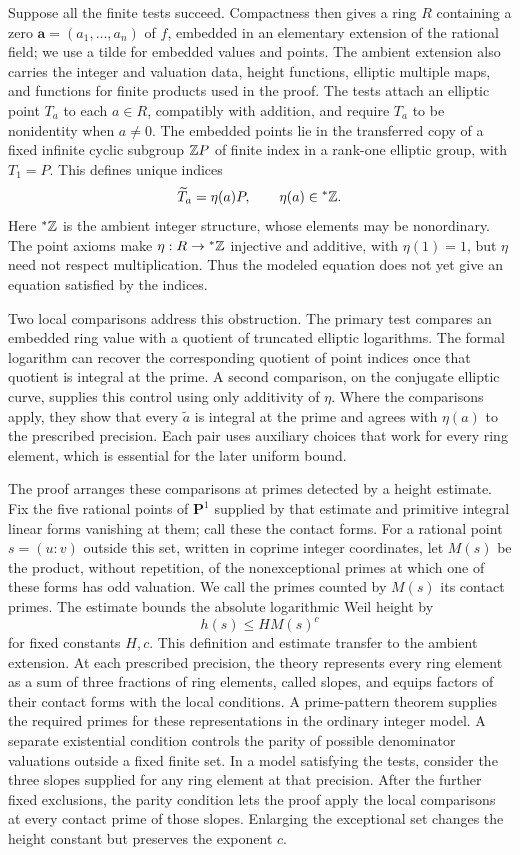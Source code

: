 Suppose all the finite tests succeed. Compactness then gives a ring \(R\) containing a zero \(\mathbf a=(a_1,\ldots,a_n)\) of \(f\), embedded in an elementary extension of the rational field; we use a tilde for embedded values and points. The ambient extension also carries the integer and valuation data, height functions, elliptic multiple maps, and functions for finite products used in the proof. The tests attach an elliptic point \(T_a\) to each \(a\in R\), compatibly with addition, and require \(T_a\) to be nonidentity when \(a\ne0\). The embedded points lie in the transferred copy of a fixed infinite cyclic subgroup \(\mathbb Z P\) of finite index in a rank-one elliptic group, with \(T_1=P\). This defines unique indices
\[
                 \widetilde T_a=\eta(a)P,
                 \qquad \eta(a)\in{}^*\mathbb Z.
\]
Here \({}^*\mathbb Z\) is the ambient integer structure, whose elements may be nonordinary. The point axioms make \(\eta:R\to{}^*\mathbb Z\) injective and additive, with \(\eta(1)=1\), but \(\eta\) need not respect multiplication. Thus the modeled equation does not yet give an equation satisfied by the indices.

Two local comparisons address this obstruction. The primary test compares an embedded ring value with a quotient of truncated elliptic logarithms. The formal logarithm can recover the corresponding quotient of point indices once that quotient is integral at the prime. A second comparison, on the conjugate elliptic curve, supplies this control using only additivity of \(\eta\). Where the comparisons apply, they show that every \(\widetilde a\) is integral at the prime and agrees with \(\eta(a)\) to the prescribed precision. Each pair uses auxiliary choices that work for every ring element, which is essential for the later uniform bound.

The proof arranges these comparisons at primes detected by a height estimate. Fix the five rational points of \(\mathbf P^1\) supplied by that estimate and primitive integral linear forms vanishing at them; call these the contact forms. For a rational point \(s=(u:v)\) outside this set, written in coprime integer coordinates, let \(M(s)\) be the product, without repetition, of the nonexceptional primes at which one of these forms has odd valuation. We call the primes counted by \(M(s)\) its contact primes. The estimate bounds the absolute logarithmic Weil height by
\[
                              h(s)\le H M(s)^c
\]
for fixed constants \(H,c\). This definition and estimate transfer to the ambient extension. At each prescribed precision, the theory represents every ring element as a
sum of three fractions of ring elements, called slopes, and equips factors of
their contact forms with the local conditions. A prime-pattern theorem supplies
the required primes for these representations in the ordinary integer model.
A separate existential condition controls the parity of possible denominator
valuations outside a fixed finite set. In a model satisfying the tests, consider
the three slopes supplied for any ring element at that precision. After the
further fixed exclusions, the parity condition lets the proof apply the local
comparisons at every contact prime of those slopes. Enlarging the exceptional
set changes the height constant but preserves the exponent \(c\).

